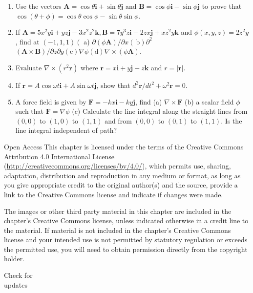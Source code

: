 \documentclass[10pt]{article}
\begin{document}
\begin{enumerate}
  \item Use the vectors $\mathbf{A}=\cos \theta \mathbf{i}+\sin \theta \mathbf{j}$ and $\mathbf{B}=\cos \phi \mathbf{i}-\sin \phi \mathbf{j}$ to prove that $\cos (\theta+\phi)=\cos \theta \cos \phi-\sin \theta \sin \phi$.
  \item If $\mathbf{A}=5 x^{2} y \mathbf{i}+y z \mathbf{j}-3 x^{2} z^{2} \mathbf{k}, \mathbf{B}=7 y^{3} z \mathbf{i}-2 z x \mathbf{j}+x z^{2} y \mathbf{k}$ and $\phi(x, y, z)=2 z^{2} y$, find at $(-1,1,1)\left(\right.$ a) $\partial(\phi \mathbf{A}) / \partial x(\mathrm{~b}) \partial^{2}$ $(\mathbf{A} \times \mathbf{B}) / \partial z \partial y(\mathrm{c}) \nabla \phi(\mathrm{d}) \nabla \times(\phi \mathbf{A})$.
  \item Evaluate $\nabla \times\left(r^{2} \mathbf{r}\right)$ where $\mathbf{r}=x \mathbf{i}+y \mathbf{j}-z \mathbf{k}$ and $r=|\mathbf{r}|$.
  \item If $\mathbf{r}=A \cos \omega t \mathbf{i}+A \sin \omega t \mathbf{j}$, show that $d^{2} \mathbf{r} / d t^{2}+\omega^{2} \mathbf{r}=0$.
  \item A force field is given by $\mathbf{F}=-k x \mathbf{i}-k y \mathbf{j}$, find (a) $\nabla \times \mathbf{F}$ (b) a scalar field $\phi$ such that $\mathbf{F}=\nabla \phi$ (c) Calculate the line integral along the straight lines from $(0,0)$ to $(1,0)$ to $(1,1)$ and from $(0,0)$ to $(0,1)$ to $(1,1)$. Is the line integral independent of path?
\end{enumerate}

Open Access This chapter is licensed under the terms of the Creative Commons Attribution 4.0 International License (\href{http://creativecommons.org/licenses/by/4.0/}{http://creativecommons.org/licenses/by/4.0/}), which permits use, sharing, adaptation, distribution and reproduction in any medium or format, as long as you give appropriate credit to the original author(s) and the source, provide a link to the Creative Commons license and indicate if changes were made.

The images or other third party material in this chapter are included in the chapter's Creative Commons license, unless indicated otherwise in a credit line to the material. If material is not included in the chapter's Creative Commons license and your intended use is not permitted by statutory regulation or exceeds the permitted use, you will need to obtain permission directly from the copyright holder.

Check for\\
updates
\end{document}

